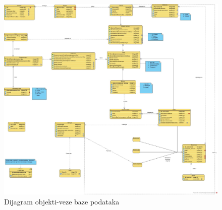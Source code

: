 \begin{figure}[!h]
    \centering
    \includegraphics[width=12cm]{Slike/ER.jpg}
    \caption{Dijagram objekti-veze baze podataka}
    \label{fig:er}
\end{figure}
\newpage
